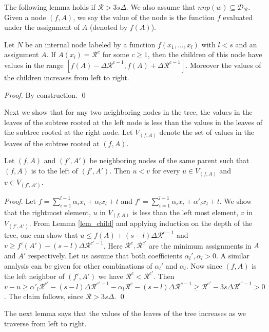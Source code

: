 \documentclass[envcountsame]{llncs}
\begin{document}
The following lemma holds if $\mathcal{R} > 3s\Delta$. We also assume that $nnp(w) \subseteq \mathcal{D}_{\mathcal{R}}$.
Given a node $(f,A)$, we say the value of the node is the function $f$ evaluated under the assignment of $A$ (denoted by $f(A)$).
\begin{lemma}
\label{lem_child}
Let $N$ be an internal node labeled by a function $f(x_1,\dots,x_l)$ with $l<s$ and an assignment $A$.
If $A(x_l) = \mathcal{R}^c$ for some $c\geq1$, then the children of this node have values in the range $[f(A)-\Delta \mathcal{R}^{c-1},
f(A)+\Delta \mathcal{R}^{c-1}]$.
Moreover the values of the children increases from left to right.
\end{lemma}
\begin{proof}
By construction.
\qed \end{proof}

Next we show that for any two neighboring nodes in the tree, the values in the leaves of the subtree rooted at the left node is less 
than the values in the leaves of the subtree rooted at the right node. Let $V_{(f,A)}$ denote the set of values in the leaves of the subtree rooted at $(f,A)$.

\begin{lemma}
 \label{lem_neighNoIntersect}
Let $(f,A)$ and $(f',A')$ be neighboring nodes of the same parent such that $(f,A)$ is to the left of $(f',A')$. Then $u<v$ for every $u \in V_{(f,A)}$ and $v \in V_{(f',A')}$.
\end{lemma}
\begin{proof}
Let $f=\sum_{i=1}^{l-1} \alpha_i x_i+\alpha_lx_l+t$ and $f' = \sum_{i=1}^{l-1} \alpha_i x_i+\alpha'_lx_l+t$. We show that the rightmost element, $u$ in $V_{(f,A)}$ is less 
than the left most element, $v$ in $V_{(f',A')}$. From Lemma \ref{lem_child} and applying induction on the depth of the tree, one can show that $u \leq
f(A)+(s-l)\Delta \mathcal{R}^{c-1}$ and 
$v \geq f'(A')-(s-l) \Delta \mathcal{R}^{c'-1}$. Here $\mathcal{R}^c,\mathcal{R}^{c'}$ are the minimum assignments in $A$ and $A'$ respectively.
Let us assume that both coefficients $\alpha_l',\alpha_l > 0$. A similar analysis can be given for other combinations of $\alpha_{l}'$ and
$\alpha_l$. 
Now since $(f,A)$ is the left neighbor of $(f',A')$ we have $\mathcal{R}^{c}<\mathcal{R}^{c'}$.  Then 
$v-u \geq \alpha'_l\mathcal{R}^{c'}-(s-l) \Delta \mathcal{R}^{c'-1}-\alpha_l\mathcal{R}^c-(s-l)\Delta \mathcal{R}^{c-1} \geq \mathcal{R}^{c'}
-3s\Delta \mathcal{R}^{c'-1} > 0$. The claim follows, since $\mathcal{R} > 3s\Delta$.
\qed \end{proof}
The next lemma says that the values of the leaves of the tree increases as we traverse from left to right.
\end{document}
